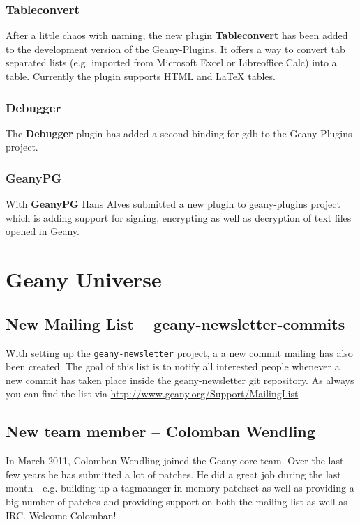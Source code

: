 \documentclass[%
paper=a4,%
fontsize=12pt,%
twoside=false,%
DIV18,
headsepline,
plainheadsepline,
footsepline,
plainfootsepline,
parskip=half,%
openany,%
]{scrartcl}
\begin{document}
\subsubsection{Tableconvert}

After a little chaos with naming, the new plugin \textbf{Tableconvert}
has been added to the development version of the Geany-Plugins. It
offers a way to convert tab separated lists (e.g. imported
from Microsoft Excel or Libreoffice Calc) into a table. Currently the
plugin supports HTML and \LaTeX{} tables.

\subsubsection{Debugger}

The \textbf{Debugger} plugin has added a second binding for gdb to
the Geany-Plugins project.

\subsubsection{GeanyPG}

With \textbf{GeanyPG} Hans Alves submitted a new plugin to
geany-plugins project which is adding support for signing,
encrypting as well as decryption of text files opened in Geany.

\section{Geany Universe}

\subsection{New Mailing List -- geany-newsletter-commits}

With setting up the \texttt{geany-newsletter} project, a
a new commit mailing has also been created. The goal of this list is
to notify all interested people whenever a new commit has taken place
inside the geany-newsletter git repository. As always you can find
the list via \url{http://www.geany.org/Support/MailingList}

\subsection{New team member -- Colomban Wendling}

In March 2011, Colomban Wendling joined the Geany core team. Over
the last few years he has submitted a lot of patches. He did a great
job during the last month - e.g. building up a tagmanager-in-memory
patchset as well as providing a big number of patches and providing
support on both the mailing list as well as IRC. Welcome Colomban!
\end{document}
